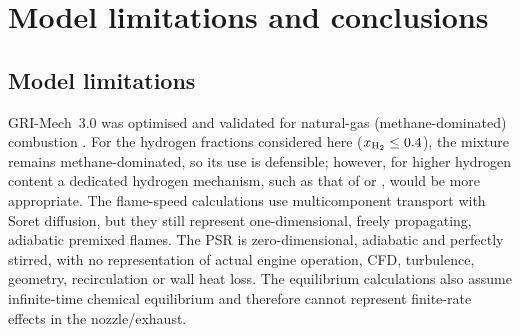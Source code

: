 \documentclass[11pt]{article}
\begin{document}
\FloatBarrier

\section{Model limitations and conclusions}

\subsection{Model limitations}
\label{sec:limitations}
GRI-Mech~3.0 was optimised and validated for natural-gas (methane-dominated)
combustion \citep{grimech30}. For the hydrogen fractions considered here
($x_{\ce{H2}} \le 0.4$), the mixture remains methane-dominated, so its use is
defensible; however, for higher hydrogen content a dedicated hydrogen
mechanism, such as that of \citet{burke2012} or \citet{oconaire2004}, would be
more appropriate. The flame-speed calculations use multicomponent transport
with Soret diffusion, but they still represent one-dimensional, freely
propagating, adiabatic premixed flames. The PSR is zero-dimensional, adiabatic
and perfectly stirred, with no representation of actual engine operation, CFD,
turbulence, geometry, recirculation or wall heat loss. The equilibrium
calculations also assume infinite-time chemical equilibrium and therefore
cannot represent finite-rate effects in the nozzle/exhaust.
\end{document}
